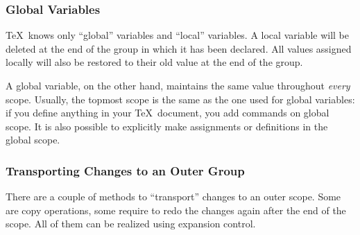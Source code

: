 \documentclass[a4paper]{ltxdoc}
\begin{document}
\subsubsection{Global Variables}
\TeX\ knows only ``global'' variables and ``local'' variables. A local variable will be deleted at the end of the group in which it has been declared. All values assigned locally will also be restored to their old value at the end of the group.

A global variable, on the other hand, maintains the same value throughout \emph{every} scope. Usually, the topmost scope is the same as the one used for global variables: if you define anything in your \TeX\ document, you add commands on global scope. It is also possible to explicitly make assignments or definitions in the global scope.




\subsubsection{Transporting Changes to an Outer Group}
There are a couple of methods to ``transport'' changes to an outer scope. Some are copy operations, some require to redo the changes again after the end of the scope. All of them can be realized using expansion control.
\end{document}
